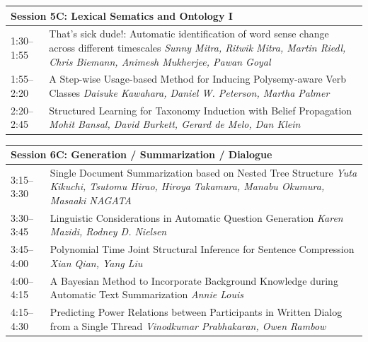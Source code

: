 \documentclass{book}
\renewcommand{\large}{\fontsize{36}{40}\selectfont}
\begin{document}
\begin{tabular}{p{3in}p{16in}}
  \multicolumn{2}{l}{\bfseries\large Session 5C: Lexical Sematics and Ontology I} \\\hline

    
    1:30--1:55
    &	That's sick dude!: Automatic identification of word sense change across different timescales \newline 
    {\itshape Sunny Mitra, Ritwik Mitra, Martin Riedl, Chris Biemann, Animesh Mukherjee, Pawan Goyal} \\
    
    1:55--2:20
    &	A Step-wise Usage-based Method for Inducing Polysemy-aware Verb Classes \newline 
    {\itshape Daisuke Kawahara, Daniel W. Peterson, Martha Palmer} \\
    
    2:20--2:45
    &	Structured Learning for Taxonomy Induction with Belief Propagation \newline 
    {\itshape Mohit Bansal, David Burkett, Gerard de Melo, Dan Klein} \\
    
\end{tabular}

\begin{tabular}{p{3in}p{16in}}
  \multicolumn{2}{l}{\bfseries\large Session 6C: Generation / Summarization / Dialogue} \\\hline

    
    3:15--3:30
    &	Single Document Summarization based on Nested Tree Structure \newline 
    {\itshape Yuta Kikuchi, Tsutomu Hirao, Hiroya Takamura, Manabu Okumura, Masaaki NAGATA} \\
    
    3:30--3:45
    &	Linguistic Considerations in Automatic Question Generation \newline 
    {\itshape Karen Mazidi, Rodney D. Nielsen} \\
    
    3:45--4:00
    &	Polynomial Time Joint Structural Inference for Sentence Compression \newline 
    {\itshape Xian Qian, Yang Liu} \\
    
    4:00--4:15
    &	A Bayesian Method to Incorporate Background Knowledge during Automatic Text Summarization \newline 
    {\itshape Annie Louis} \\
    
    4:15--4:30
    &	Predicting Power Relations between Participants in Written Dialog from a Single Thread \newline 
    {\itshape Vinodkumar Prabhakaran, Owen Rambow} \\
    
\end{tabular}
\end{document}
